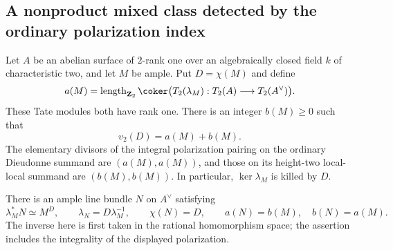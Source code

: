 \subsection{A nonproduct mixed class detected by the ordinary polarization index}
\label{sec:DE-A3-mixed-nonproduct}

\begin{lemma}
\label{lem:DE-A3-mixed-polarization-blocks}
Let $A$ be an abelian surface of $2$-rank one over an algebraically
closed field $k$ of characteristic two, and let $M$ be ample.
Put $D=\chi(M)$ and define
\[
 a(M)=\operatorname{length}_{\mathbf Z_2}
       \coker\bigl(T_2(\lambda_M):T_2(A)\longrightarrow T_2(A^\vee)\bigr).
\]
These Tate modules both have rank one.  There is an integer $b(M)\ge0$
such that
\[
                         v_2(D)=a(M)+b(M).
\]
The elementary divisors of the integral polarization pairing on the
ordinary Dieudonne summand are $(a(M),a(M))$, and those on its
height-two local-local summand are $(b(M),b(M))$.  In particular,
$\ker\lambda_M$ is killed by $D$.

There is an ample line bundle $N$ on $A^\vee$ satisfying
\[
 \lambda_M^*N\simeq M^D,\qquad
 \lambda_N=D\lambda_M^{-1},\qquad
 \chi(N)=D,\qquad
             a(N)=b(M),\quad b(N)=a(M).
\]
The inverse here is first taken in the rational homomorphism space;
the assertion includes the integrality of the displayed polarization.
\end{lemma}

